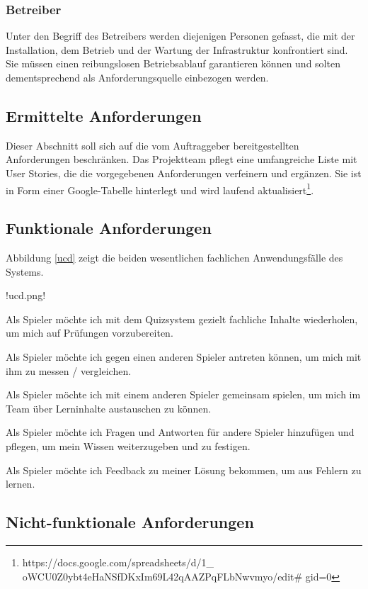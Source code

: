 \documentclass[a4paper,11pt,listof=numbered,glossary=totoc,parskip=half]{scrreprt}
\begin{document}
\subsubsection{Betreiber}

Unter den Begriff des Betreibers werden diejenigen Personen gefasst, die mit der Installation, dem Betrieb und der Wartung der Infrastruktur konfrontiert sind.
Sie müssen einen reibungslosen Betriebsablauf garantieren können und solten dementsprechend als Anforderungsquelle einbezogen werden.

\subsection{Ermittelte Anforderungen }

Dieser Abschnitt soll sich auf die vom Auftraggeber bereitgestellten Anforderungen beschränken. Das Projektteam pflegt eine umfangreiche Liste mit User Stories, die die vorgegebenen Anforderungen verfeinern und ergänzen. Sie ist in Form einer Google-Tabelle hinterlegt und wird laufend aktualisiert\footnote{https://docs.google.com/spreadsheets/d/1\_ oWCU0Z0ybt4eHaNSfDKxIm69L42qAAZPqFLbNwvmyo/edit\# gid=0}.

\subsection{Funktionale Anforderungen}

Abbildung \ref{ucd} zeigt die beiden wesentlichen fachlichen Anwendungsfälle des Systems.

!ucd.png!

Als Spieler möchte ich mit dem Quizsystem gezielt fachliche Inhalte wiederholen, um mich auf Prüfungen vorzubereiten.

Als Spieler möchte ich gegen einen anderen Spieler antreten können, um mich mit ihm zu messen / vergleichen.

Als Spieler möchte ich mit einem anderen Spieler gemeinsam spielen, um mich im Team über Lerninhalte austauschen zu können.

Als Spieler möchte ich Fragen und Antworten für andere Spieler hinzufügen und pflegen, um mein Wissen weiterzugeben und zu festigen.

Als Spieler möchte ich Feedback zu meiner Lösung bekommen, um aus Fehlern zu lernen.


\subsection{Nicht-funktionale Anforderungen}
\end{document}
